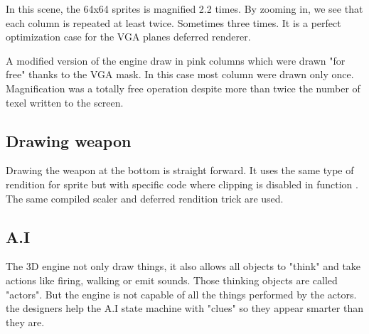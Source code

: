 \par
\begin{figure}[H]
 \centering
\end{figure}
In this scene, the 64x64 sprites is magnified 2.2 times. By zooming in, we see that each column is repeated at least twice. Sometimes three times. It is a perfect optimization case for the VGA planes deferred renderer.\\
\par
A modified version of the engine draw in pink columns which were drawn "for free" thanks to the VGA mask. In this case most column were drawn only once. Magnification was a totally free operation despite more than twice the number of texel written to the screen.\\

\par
\begin{figure}[H]
 \centering
\end{figure}
\begin{figure}[H]
 \centering
\end{figure}






\subsection{Drawing weapon}
Drawing the weapon at the bottom is straight forward. It uses the same type of rendition for sprite but with specific code where clipping is disabled in function . The same compiled scaler and deferred rendition trick are used.














\subsection{A.I}
The 3D engine not only draw things, it also allows all objects to "think" and take actions like firing, walking or emit sounds. Those thinking objects are called "actors". But the engine is not capable of all the things performed by the actors. the designers help the A.I state machine with "clues" so they appear smarter than they are.\\
\par






